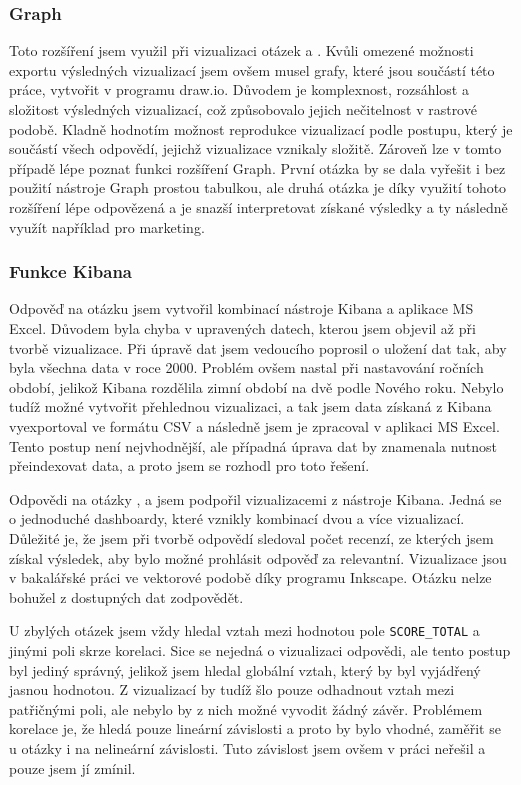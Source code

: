 \documentclass[czech,BP]{thesiskiv}
\begin{document}
\subsubsection{Graph}
Toto rozšíření jsem využil při vizualizaci otázek  a . Kvůli omezené možnosti exportu výsledných vizualizací jsem ovšem musel grafy, které jsou součástí této práce, vytvořit v  programu draw.io. Důvodem je komplexnost, rozsáhlost a složitost výsledných vizualizací, což způsobovalo jejich nečitelnost v rastrové podobě. Kladně hodnotím možnost reprodukce vizualizací podle postupu, který je součástí všech odpovědí, jejichž vizualizace vznikaly složitě. Zároveň lze v tomto případě lépe poznat funkci rozšíření Graph. První otázka by se dala vyřešit i bez použití nástroje Graph prostou tabulkou, ale druhá otázka je díky využití tohoto rozšíření lépe odpovězená a je snazší interpretovat získané výsledky a ty následně využít například pro marketing.

\subsubsection{Funkce Kibana}
Odpověď na otázku  jsem vytvořil kombinací nástroje Kibana a aplikace MS Excel. Důvodem byla chyba v upravených datech, kterou jsem objevil až při tvorbě vizualizace. Při úpravě dat jsem vedoucího poprosil o uložení dat tak, aby byla všechna data v roce 2000. Problém ovšem nastal při nastavování ročních období, jelikož Kibana rozdělila zimní období na dvě podle Nového roku. Nebylo tudíž možné vytvořit přehlednou vizualizaci, a tak jsem data získaná z Kibana vyexportoval ve formátu CSV a následně jsem je zpracoval v aplikaci MS Excel. Tento postup není nejvhodnější, ale případná úprava dat by znamenala nutnost přeindexovat data, a proto jsem se rozhodl pro toto řešení.

Odpovědi na otázky ,  a  jsem podpořil vizualizacemi z nástroje Kibana. Jedná se o jednoduché dashboardy, které vznikly kombinací dvou a více vizualizací. Důležité je, že jsem při tvorbě odpovědí sledoval počet recenzí, ze kterých jsem získal výsledek, aby bylo možné prohlásit odpověď za relevantní. Vizualizace jsou v bakalářské práci ve vektorové podobě díky programu Inkscape. Otázku  nelze bohužel z dostupných dat zodpovědět.


U zbylých otázek jsem vždy hledal vztah mezi hodnotou pole \texttt{SCO\-RE\_TO\-TAL} a jinými poli skrze  korelaci. Sice se nejedná o vizualizaci odpovědi, ale tento postup byl jediný správný, jelikož jsem hledal globální vztah, který by byl vyjádřený jasnou hodnotou. Z vizualizací by tudíž šlo pouze odhadnout vztah mezi patřičnými poli, ale nebylo by z nich možné vyvodit žádný závěr. Problémem korelace je, že hledá pouze lineární závislosti a proto by bylo vhodné, zaměřit se u otázky  i na nelineární závislosti. Tuto závislost jsem ovšem v práci neřešil a pouze jsem jí zmínil.
\end{document}
